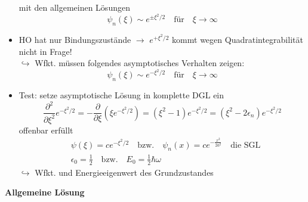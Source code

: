 \documentclass[10pt,article,colorback,accentcolor=tud9d]{scrartcl}
\begin{document}
\begin{itemize}
\begin{equation}
    \end{equation}
    mit den allgemeinen Lösungen
    \begin{equation}
    \psi_n(\xi)\sim e^{\pm\xi^2/2} \quad \text{für}\quad \xi\rightarrow\infty
    \end{equation}
  \item HO hat nur Bindungszustände $\rightarrow$ $e^{+\xi^2/2}$ kommt wegen Quadratintegrabilität nicht in Frage!\\
    $\hookrightarrow$ Wfkt. müssen folgendes asymptotisches Verhalten zeigen:
    \begin{equation}
    \psi_n(\xi)\sim e^{-\xi^2/2} \quad \text{für}\quad \xi\rightarrow\infty
    \end{equation}
    \item Test: setze asymptotische Lösung in komplette DGL ein
    \begin{equation}
    \frac{\partial^2}{\partial\xi^2}e^{-\xi^2/2}=-\frac{\partial}{\partial\xi}\left(\xi e^{-\xi^2/2}\right)=(\xi^2-1)e^{-\xi^2/2}=(\xi^2-2\epsilon_n)e^{-\xi^2/2}
    \end{equation}
    offenbar erfüllt
    \begin{align}
    &\psi(\xi)=ce^{-\xi^2/2}\quad\text{bzw.}\quad\psi_n(x)=ce^{-\frac{x^2}{2a^2}}\quad\text{die SGL}\\
    &\epsilon_0=\frac{1}{2}\quad\text{bzw.}\quad E_0=\frac{1}{2}\hbar\omega
    \end{align}
    $\hookrightarrow$ Wfkt. und Energieeigenwert des Grundzustandes
\end{itemize}
\textbf{Allgemeine Lösung}
\end{document}
